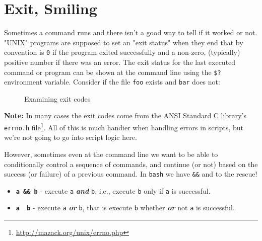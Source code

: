 \documentclass[10pt,american,]{book}
\newenvironment{Shaded}{\begin{snugshade}}{\end{snugshade}}
\newcommand{\KeywordTok}[1]{\textcolor[rgb]{0.13,0.29,0.53}{\textbf{{#1}}}}
\newcommand{\OtherTok}[1]{\textcolor[rgb]{0.56,0.35,0.01}{{#1}}}
\newcommand{\NormalTok}[1]{{#1}}
\renewcommand{\href}[2]{#2\footnote{\url{#1}}}
\numberwithin{figure}{chapter}
\DeclareRobustCommand{\drcap}[1]{\begin{figure}[H]\caption{#1}\end{figure}}
\renewcommand{\KeywordTok}[1]{{#1}}
\renewcommand{\OtherTok}[1]{{#1}}
\renewcommand{\NormalTok}[1]{{#1}}
\begin{document}
\section*{Exit, Smiling}\label{exit-smiling}

Sometimes a command runs and there isn't a good way to tell if it worked
or not. "UNIX" programs are supposed to set an "exit status" when they
end that by convention is \texttt{0} if the program exited successfully
and a non-zero, (typically) positive number if there was an error. The
exit status for the last executed command or program can be shown at the
command line using the \texttt{\$?} environment variable. Consider if
the file \texttt{foo} exists and \texttt{bar} does not:

\drcap{Examining exit codes}

\begin{Shaded}
\end{Shaded}

\textbf{Note:} In many cases the exit codes come from the ANSI Standard
C library's \href{http://mazack.org/unix/errno.php}{\texttt{errno.h}
file}. All of this is much handier when handling errors in scripts, but
we're not going to go into script logic here.

However, sometimes even at the command line we want to be able to
conditionally control a sequence of commands, and continue (or not)
based on the success (or failure) of a previous command. In
\texttt{bash} we have \texttt{\&\&} and \texttt{\textbar{}\textbar{}} to
the rescue! 

\begin{itemize}
\item
  \textbf{\texttt{a\ \&\&\ b}} - execute \texttt{a} \textbf{\emph{and}}
  \texttt{b}, i.e., execute \texttt{b} only if \texttt{a} is successful.
\item
  \textbf{\texttt{a\ \textbar{}\textbar{}\ b}} - execute \texttt{a}
  \textbf{\emph{or}} \texttt{b}, that is execute \texttt{b} whether
  \textbf{\emph{or}} not \texttt{a} is successful.
\end{itemize}
\end{document}
